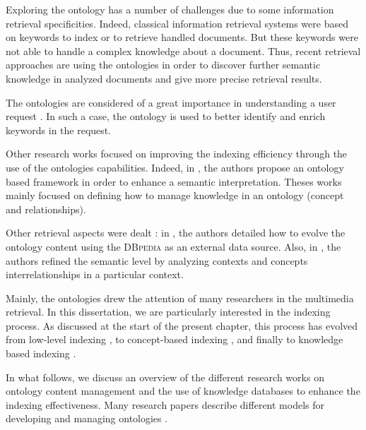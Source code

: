 	Exploring the ontology has a number of challenges due to some information retrieval specificities. 
	Indeed, classical information retrieval systems were based on keywords to index or to retrieve handled 
	documents. But these keywords were not able to handle 
	a complex knowledge about a document. Thus, recent retrieval approaches are using the ontologies 
	in order to discover further semantic knowledge in analyzed documents and give more precise retrieval results. 

	The ontologies are considered of a great importance in understanding a user request \citep{Fu2005,Wu2008,Zhai2012}. 
	In such a case, the ontology is used to better identify and enrich keywords in the request. 

	Other research works focused on improving the indexing efficiency through the use of the ontologies capabilities. 
	Indeed, in \citep{Leite2008,Cheng2012,Mukesh2013}, the authors propose an ontology based framework in order to 
	enhance a semantic interpretation. Theses works mainly focused on defining how  to manage knowledge in an 
	ontology (concept and relationships). 	

	Other retrieval aspects were dealt : in \citep{Rodriguez-Garcia2012}, the authors detailed how to evolve 
	the ontology content using the \textsc{DBpedia} as an external data source. Also, in \citep{Mustafa2008}, 
	the authors  refined the semantic level by analyzing contexts and concepts interrelationships in a 
	particular context.

	Mainly, the ontologies drew the attention of many researchers in the multimedia retrieval. 
	In this dissertation, we are particularly interested in the indexing process. As discussed at the 
	start of the present chapter, this process has evolved from low-level indexing \citep{Adami2001,OConnor2005}, 
	to concept-based indexing \cite{Elleuch2010b,Egozi2011}, and finally to knowledge based indexing 
	\citep{Zarka2011,Elleuch2011,Kumar2012}.
	

	In what follows, we discuss an overview of the different research works on ontology content management 
	and the use of knowledge databases to enhance the indexing effectiveness. 
		Many research papers describe different models for developing and managing ontologies 
		\citep{Sure1999,Fernandez-Lopez1999,Noy2001,Vrandecic2005,Li2007}.	


